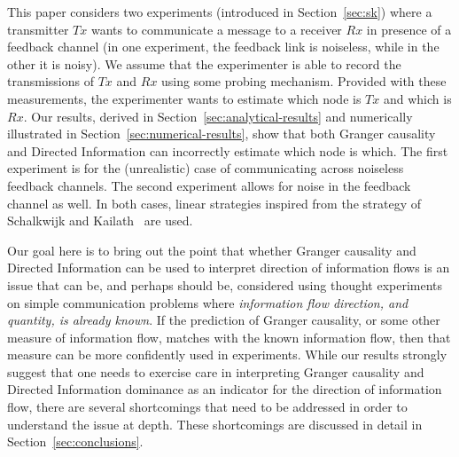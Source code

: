 \documentclass[conference]{IEEEtran}
\begin{document}
This paper considers two experiments (introduced in Section~\ref{sec:sk}) where a transmitter $Tx$ wants to communicate a message to a receiver $Rx$ in presence of a feedback channel (in one experiment, the feedback link is noiseless, while in the other it is noisy). We assume that the experimenter is able to record the transmissions of $Tx$ and $Rx$ using some probing mechanism. Provided with these measurements, the experimenter wants to estimate which node is $Tx$ and which is $Rx$. Our results, derived in Section~\ref{sec:analytical-results} and numerically illustrated in Section~\ref{sec:numerical-results}, show that both Granger causality and Directed Information can incorrectly estimate which node is which. The first experiment is for the (unrealistic) case of communicating across noiseless feedback channels. The second experiment allows for noise in the feedback channel as well. In both cases, linear strategies inspired from the strategy of Schalkwijk and Kailath~\cite{S&K} are used.

Our goal here is to bring out the point that whether Granger causality and Directed Information can be used to interpret direction of information flows is an issue that can be, and perhaps should be, considered using thought experiments on simple communication problems where \emph{information flow direction, and quantity, is already known}. If the prediction of Granger causality, or some other measure of information flow, matches with the known information flow, then that measure can be more confidently used in experiments. While our results strongly suggest that one needs to exercise care in interpreting Granger causality and Directed Information dominance as an indicator for the direction of information flow, there are several shortcomings that need to be addressed in order to understand the issue at depth. These shortcomings are discussed in detail in Section~\ref{sec:conclusions}.
\end{document}
